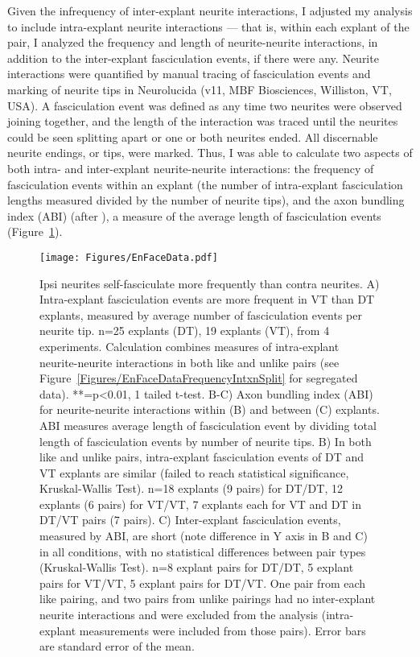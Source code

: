 Given the infrequency of inter-explant neurite interactions, I adjusted my analysis to include intra-explant neurite interactions --- that is, within each explant of the pair, I analyzed the frequency and length of neurite-neurite interactions, in addition to the inter-explant fasciculation events, if there were any.
Neurite interactions were quantified by manual tracing of fasciculation events and marking of neurite tips in Neurolucida (v11, MBF Biosciences, Williston, VT, USA).
A fasciculation event was defined as any time two neurites were observed joining together, and the length of the interaction was traced until the neurites could be seen splitting apart or one or both neurites ended.
All discernable neurite endings, or tips, were marked.
Thus, I was able to calculate two aspects of both intra- and inter-explant neurite-neurite interactions: the frequency of fasciculation events within an explant (the number of intra-explant fasciculation lengths measured divided by the number of neurite tips), and the axon bundling index (ABI) (after ), a measure of the average length of fasciculation events (Figure~\ref{Figures/EnFaceData}).
\begin{figure}[hbtp]
    \begin{center}
        \texttt{[image: Figures/EnFaceData.pdf]}
        \caption[Ipsi neurites self-fasciculate more frequently than contra neurites.]
        {Ipsi neurites self-fasciculate more frequently than contra neurites.
        A) Intra-explant fasciculation events are more frequent in VT than DT explants, measured by average number of fasciculation events per neurite tip.
        n=25 explants (DT), 19 explants (VT), from 4 experiments.
        Calculation combines measures of intra-explant neurite-neurite interactions in both like and unlike pairs (see Figure~\ref{Figures/EnFaceDataFrequencyIntxnSplit} for segregated data).
        **=p<0.01, 1 tailed t-test.
        B-C) Axon bundling index (ABI) for neurite-neurite interactions within (B) and between (C) explants.
        ABI measures average length of fasciculation event by dividing total length of fasciculation events by number of neurite tips.
        B) In both like and unlike pairs, intra-explant fasciculation events of DT and VT explants are similar (failed to reach statistical significance, Kruskal-Wallis Test).
        n=18 explants (9 pairs) for DT/DT, 12 explants (6 pairs) for VT/VT, 7 explants each for VT and DT in DT/VT pairs (7 pairs).
        C) Inter-explant fasciculation events, measured by ABI, are short (note difference in Y axis in B and C) in all conditions, with no statistical differences between pair types (Kruskal-Wallis Test).
        n=8 explant pairs for DT/DT, 5 explant pairs for VT/VT, 5 explant pairs for DT/VT.
        One pair from each like pairing, and two pairs from unlike pairings had no inter-explant neurite interactions and were excluded from the analysis (intra-explant measurements were included from those pairs).
        Error bars are standard error of the mean.
        }
        \label{Figures/EnFaceData}
    \end{center}
\end{figure}

